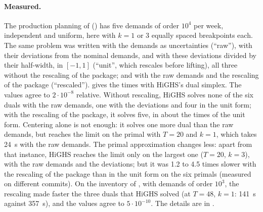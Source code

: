 \paragraph{Measured.}
The production planning of \citet[Section~6.1]{GKW2019} () has five demands of order $10^4$ per week, independent and uniform, here with $k = 1$ or $3$ equally spaced breakpoints each.
The same problem was written with the demands as uncertainties (``raw''), with their deviations from the nominal demands, and with these deviations divided by their half-width, in $[-1, 1]$ (``unit'', which rescales before lifting),
all three without the rescaling of the package;
and with the raw demands and the rescaling of the package (``rescaled'').
 gives the times with HiGHS's dual simplex.
The values agree to $2\cdot10^{-8}$ relative.
Without rescaling, HiGHS solves none of the six duals with the raw demands, one with the deviations and four in the unit form;
with the rescaling of the package, it solves five, in about the times of the unit form.
Centering alone is not enough: it solves one more dual than the raw demands, but reaches the limit on the primal with $T = 20$ and $k = 1$, which takes 24~s with the raw demands.
The primal approximation changes less: apart from that instance, HiGHS reaches the limit only on the largest one ($T = 20$, $k = 3$), with the raw demands and the deviations;
but it was 1.2 to 4.5 times slower with the rescaling of the package than in the unit form on the six primals (measured on different commits).
On the inventory of \citet[Section~5]{KWG2011}, with demands of order $10^3$, the rescaling made faster the three duals that HiGHS solved (at $T = 48$, $k = 1$: 141~s against 357~s),
and the values agree to $5\cdot10^{-10}$.
The details are in .

